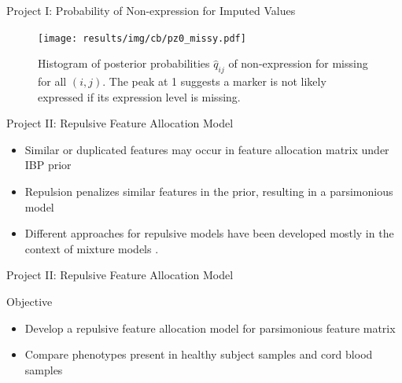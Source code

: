 \documentclass[ignorenonframetext,]{beamer}
\begin{document}
\begin{frame}{Project I: Probability of Non-expression for Imputed Values}
\begin{figure}
\begin{center}
  \texttt{[image: results/img/cb/pz0\_missy.pdf]}
  \caption{Histogram of posterior probabilities $\hat{q}_{ij}$ of
  non-expression for missing for all $(i,j)$.  The peak at 1 suggests 
  a marker is not likely expressed if its expression level is
  missing.}
\end{center}
\end{figure}
\end{frame}





\begin{frame}{Project II: Repulsive Feature Allocation Model}
  \begin{itemize}
    \setlength\itemsep{1em}
    \item Similar or duplicated features may occur in feature allocation matrix under IBP prior
    \item Repulsion penalizes similar features in the prior, resulting in a parsimonious model
    \item Different approaches for repulsive models have been developed mostly
    in the context of mixture models \citep{petralia2012repulsive,
    quinlan2017parsimonious, xie2017bayesian, quinlan2017density}. 
  \end{itemize}
\end{frame}

\begin{frame}{Project II: Repulsive Feature Allocation Model}
  \begin{block}{Objective}
  \begin{itemize}
    \setlength\itemsep{1em}
    \item Develop a repulsive feature allocation model for parsimonious feature
      matrix
    \item Compare phenotypes present in healthy subject samples and cord blood samples
  \end{itemize}
\end{block}
\end{frame}
\end{document}
